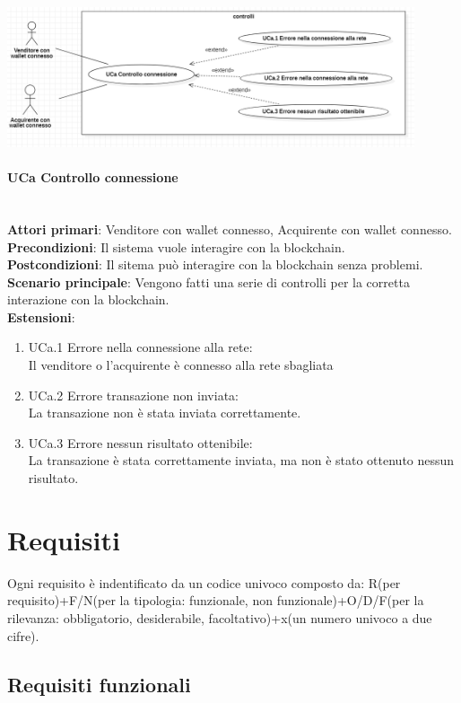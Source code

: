 \documentclass[a4paper, 12pt]{article}
\begin{document}
\includegraphics[width=0.9\textwidth]{UC_controlli}

\paragraph{UCa Controllo connessione}\\
\textbf{Attori primari}: Venditore con wallet connesso, Acquirente con wallet connesso. \\
\textbf{Precondizioni}: Il sistema vuole interagire con la blockchain.\\
\textbf{Postcondizioni}:  Il sitema può interagire con la blockchain senza problemi.\\
\textbf{Scenario principale}:
Vengono fatti una serie di controlli per la corretta interazione con la blockchain.\\
\textbf{Estensioni}:
\begin{enumerate}
    \item UCa.1 Errore nella connessione alla rete:\\
        Il venditore o l'acquirente è connesso alla rete sbagliata
    \item UCa.2 Errore transazione non inviata:\\
        La transazione non è stata inviata correttamente.
    \item UCa.3 Errore nessun risultato ottenibile:\\
        La transazione è stata correttamente inviata, ma non è stato ottenuto nessun risultato.
\end{enumerate}

\section{Requisiti}
Ogni requisito è indentificato da un codice univoco composto da: R(per requisito)+F/N(per la tipologia: funzionale, non funzionale)+O/D/F(per la rilevanza: obbligatorio, desiderabile, facoltativo)+x(un numero univoco a due cifre).
\subsection{Requisiti funzionali}
 
\end{document}
